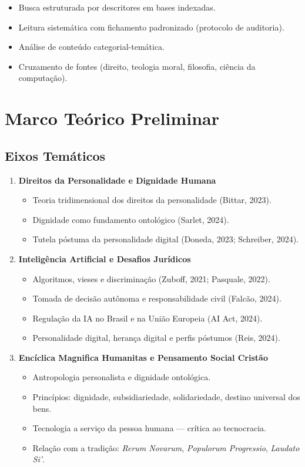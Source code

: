 \documentclass[12pt,a4paper]{article}
\begin{document}
\begin{itemize}
\item Busca estruturada por descritores em bases indexadas.
\item Leitura sistemática com fichamento padronizado (protocolo de auditoria).
\item Análise de conteúdo categorial-temática.
\item Cruzamento de fontes (direito, teologia moral, filosofia, ciência da computação).
\end{itemize}

\section{Marco Teórico Preliminar}

\subsection{Eixos Temáticos}

\begin{enumerate}
\item \textbf{Direitos da Personalidade e Dignidade Humana}
    \begin{itemize}
    \item Teoria tridimensional dos direitos da personalidade (Bittar, 2023).
    \item Dignidade como fundamento ontológico (Sarlet, 2024).
    \item Tutela póstuma da personalidade digital (Doneda, 2023; Schreiber, 2024).
    \end{itemize}

\item \textbf{Inteligência Artificial e Desafios Jurídicos}
    \begin{itemize}
    \item Algoritmos, vieses e discriminação (Zuboff, 2021; Pasquale, 2022).
    \item Tomada de decisão autônoma e responsabilidade civil (Falcão, 2024).
    \item Regulação da IA no Brasil e na União Europeia (AI Act, 2024).
    \item Personalidade digital, herança digital e perfis póstumos (Reis, 2024).
    \end{itemize}

\item \textbf{Encíclica Magnifica Humanitas e Pensamento Social Cristão}
    \begin{itemize}
    \item Antropologia personalista e dignidade ontológica.
    \item Princípios: dignidade, subsidiariedade, solidariedade, destino universal dos bens.
    \item Tecnologia a serviço da pessoa humana — crítica ao tecnocracia.
    \item Relação com a tradição: \textit{Rerum Novarum}, \textit{Populorum Progressio}, \textit{Laudato Si'}.
    \end{itemize}
\end{enumerate}
\end{document}
